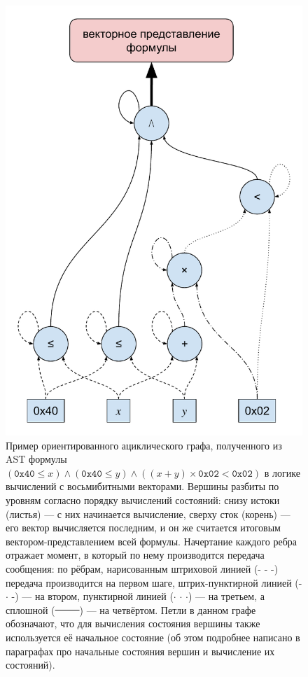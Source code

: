 \begin{figure}[H]
\begin{center}
    \includegraphics[scale=0.95]{./assets/formula-ast-message-flow.pdf}
    \caption{\label{formula-ast-message-flow} Пример ориентированного ациклического графа, полученного из AST формулы $(\texttt{0x40} \le x) \wedge (\texttt{0x40} \le y) \wedge ((x + y) \times \texttt{0x02} < \texttt{0x02})$ в логике вычислений с восьмибитными векторами. Вершины разбиты по уровням согласно порядку вычислений состояний: снизу истоки (листья) --- с них начинается вычисление, сверху сток (корень) --- его вектор вычисляется последним, и он же считается итоговым вектором-представлением всей формулы. Начертание каждого ребра отражает момент, в который по нему производится передача сообщения: по рёбрам, нарисованным штриховой линией (- - -) передача производится на первом шаге, штрих-пунктирной линией (- $\cdot$ -) --- на втором, пунктирной линией ($\cdot$ $\cdot$ $\cdot$) --- на третьем, а сплошной (\sout{\ \ \ \ \ }) --- на четвёртом. Петли в данном графе обозначают, что для вычисления состояния вершины также используется её начальное состояние (об этом подробнее написано в параграфах про начальные состояния вершин и вычисление их состояний).}
\end{center}
\end{figure}

